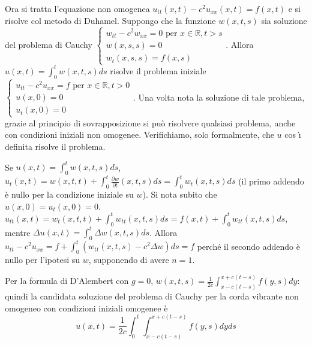 \documentclass{article}
\begin{document}
Ora si tratta l'equazione non omogenea $u_{tt}\left( x,t\right)
-c^{2}u_{xx}\left( x,t\right) =f\left( x,t\right) $ e si risolve col metodo
di Duhamel. Suppongo che la funzione $%
w\left( x,t,s\right) $ sia soluzione del problema di Cauchy $\left\{ 
\begin{array}{c}
w_{tt}-c^{2}w_{xx}=0\text{ per }x\in 
\mathbb{R}
,t>s \\ 
w\left( x,s,s\right) =0 \\ 
w_{t}\left( x,s,s\right) =f\left( x,s\right)%
\end{array}%
\right. $. Allora $u\left( x,t\right) =\int_{0}^{t}w\left( x,t,s\right) ds$
risolve il problema iniziale $\left\{ 
\begin{array}{c}
u_{tt}-c^{2}u_{xx}=f\text{ per }x\in 
\mathbb{R}
,t>0 \\ 
u\left( x,0\right) =0 \\ 
u_{t}\left( x,0\right) =0%
\end{array}%
\right. $. Una volta nota la soluzione di tale problema, grazie al principio
di sovrapposizione si pu\`{o} risolvere qualsiasi problema, anche con
condizioni iniziali non omogenee. Verifichiamo, solo formalmente, che $u$ cos%
\`{\i} definita risolve il problema.

Se $u\left( x,t\right) =\int_{0}^{t}w\left( x,t,s\right) ds$, $u_{t}\left(
x,t\right) =w\left( x,t,t\right) +\int_{0}^{t}\frac{\partial w}{\partial t}%
\left( x,t,s\right) ds=\int_{0}^{t}w_{t}\left( x,t,s\right) ds$ (il primo
addendo \`{e} nullo per la condizione iniziale su $w$). Si nota subito che $%
u\left( x,0\right) =u_{t}\left( x,0\right) =0$. $u_{tt}\left( x,t\right)
=w_{t}\left( x,t,t\right) +\int_{0}^{t}w_{tt}\left( x,t,s\right) ds=f\left(
x,t\right) +\int_{0}^{t}w_{tt}\left( x,t,s\right) ds$, mentre $\Delta
u\left( x,t\right) =\int_{0}^{t}\Delta w\left( x,t,s\right) ds$. Allora $%
u_{tt}-c^{2}u_{xx}=f+\int_{0}^{t}\left( w_{tt}\left( x,t,s\right)
-c^{2}\Delta w\right) ds=f$ perch\'{e} il secondo addendo \`{e} nullo per
l'ipotesi su $w$, supponendo di avere $n=1$.

Per la formula di D'Alembert con $g=0$, $w\left( x,t,s\right) =\frac{1}{2c}%
\int_{x-c\left( t-s\right) }^{x+c\left( t-s\right) }f\left( y,s\right) dy$:
quindi la candidata soluzione del problema di Cauchy per la corda vibrante
non omogeneo con condizioni iniziali omogenee \`{e}%
\begin{equation*}
u\left( x,t\right) =\frac{1}{2c}\int_{0}^{t}\int_{x-c\left( t-s\right)
}^{x+c\left( t-s\right) }f\left( y,s\right) dyds
\end{equation*}
\end{document}
